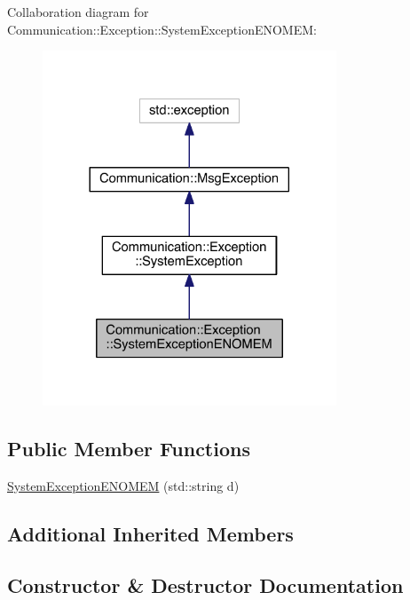 Collaboration diagram for Communication\+:\+:Exception\+:\+:System\+Exception\+E\+N\+O\+M\+E\+M\+:\nopagebreak
\begin{figure}[H]
\begin{center}
\leavevmode
\includegraphics[width=248pt]{class_communication_1_1_exception_1_1_system_exception_e_n_o_m_e_m__coll__graph}
\end{center}
\end{figure}
\subsection*{Public Member Functions}
\begin{DoxyCompactItemize}
\item 
\hyperlink{class_communication_1_1_exception_1_1_system_exception_e_n_o_m_e_m_ad96aa77c268c589f100de310de178b74}{System\+Exception\+E\+N\+O\+M\+E\+M} (std\+::string d)
\end{DoxyCompactItemize}
\subsection*{Additional Inherited Members}


\subsection{Constructor \& Destructor Documentation}
\hypertarget{class_communication_1_1_exception_1_1_system_exception_e_n_o_m_e_m_ad96aa77c268c589f100de310de178b74}{}

